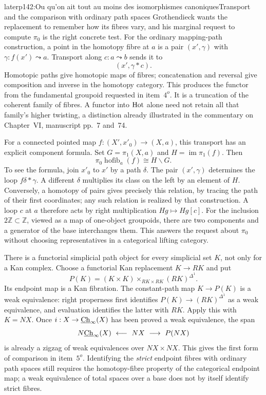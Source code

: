 \begin{dcomment}{later}{p142:Ou qu'on ait tout au moins des isomorphismes canoniques}{Transport and the comparison with ordinary path spaces}
Grothendieck wants the replacement to remember how its fibres vary, and his marginal request to compute $\pi_0$ is the right concrete test. For the ordinary mapping-path construction, a point in the homotopy fibre at $a$ is a pair $(x',\gamma)$ with $\gamma:f(x')\leadsto a$. Transport along $c:a\leadsto b$ sends it to
\[
                       (x',\gamma*c).
\]
Homotopic paths give homotopic maps of fibres; concatenation and reversal give composition and inverse in the homotopy category. This produces the functor from the fundamental groupoid requested in item~$4^o$. It is a truncation of the coherent family of fibres. A functor into $\mathrm{Hot}$ alone need not retain all that family's higher twisting, a distinction already illustrated in the commentary on Chapter~VI, manuscript pp.~7 and~74.

For a connected pointed map $f:(X',x'_0)\to(X,a)$, this transport has an explicit component formula. Set $G=\pi_1(X,a)$ and $H=\operatorname{im}\pi_1(f)$. Then
\[
                   \pi_0\operatorname{hofib}_a(f)\cong H\backslash G.
\]
To see the formula, join $x'_0$ to $x'$ by a path $\delta$. The pair $(x',\gamma)$ determines the loop $f\delta*\gamma$. A different $\delta$ multiplies its class on the left by an element of $H$. Conversely, a homotopy of pairs gives precisely this relation, by tracing the path of their first coordinates; any such relation is realized by that construction. A loop $c$ at $a$ therefore acts by right multiplication $Hg\mapsto Hg[c]$. For the inclusion $2\mathbb Z\subset\mathbb Z$, viewed as a map of one-object groupoids, there are two components and a generator of the base interchanges them. This answers the request about $\pi_0$ without choosing representatives in a categorical lifting category.

There is a functorial simplicial path object for every simplicial set $K$, not only for a Kan complex. Choose a functorial Kan replacement $K\to RK$ and put
\[
 P(K)=(K\times K)\times_{RK\times RK}(RK)^{\Delta^1}.
\]
Its endpoint map is a Kan fibration. The constant-path map $K\to P(K)$ is a weak equivalence: right properness first identifies $P(K)\to(RK)^{\Delta^1}$ as a weak equivalence, and evaluation identifies the latter with $RK$. Apply this with $K=NX$. Once $i:X\to\underline{\mathrm{Ch}}_\infty(X)$ has been proved a weak equivalence, the span
\[
             N\underline{\mathrm{Ch}}_\infty(X)\ \longleftarrow\ NX
                              \ \longrightarrow\ P(NX)
\]
is already a zigzag of weak equivalences over $NX\times NX$. This gives the first form of comparison in item~$5^o$. Identifying the \emph{strict} endpoint fibres with ordinary path spaces still requires the homotopy-fibre property of the categorical endpoint map; a weak equivalence of total spaces over a base does not by itself identify strict fibres.


\end{dcomment}

